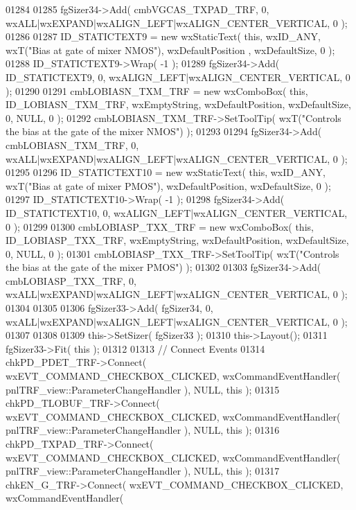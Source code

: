 \begin{DoxyCode}
01284     
01285     fgSizer34->Add( cmbVGCAS_TXPAD_TRF, 0, wxALL|wxEXPAND|wxALIGN\_LEFT|wxALIGN\_CENTER\_VERTICAL, 0 );
01286     
01287     ID_STATICTEXT9 = \textcolor{keyword}{new} wxStaticText( \textcolor{keyword}{this}, wxID\_ANY, wxT(\textcolor{stringliteral}{"Bias at gate of mixer NMOS"}), wxDefaultPosition
      , wxDefaultSize, 0 );
01288     ID_STATICTEXT9->Wrap( -1 );
01289     fgSizer34->Add( ID_STATICTEXT9, 0, wxALIGN\_LEFT|wxALIGN\_CENTER\_VERTICAL, 0 );
01290     
01291     cmbLOBIASN_TXM_TRF = \textcolor{keyword}{new} wxComboBox( \textcolor{keyword}{this}, ID_LOBIASN_TXM_TRF, wxEmptyString, wxDefaultPosition, 
      wxDefaultSize, 0, NULL, 0 ); 
01292     cmbLOBIASN_TXM_TRF->SetToolTip( wxT(\textcolor{stringliteral}{"Controls the bias at the gate of the mixer NMOS"}) );
01293     
01294     fgSizer34->Add( cmbLOBIASN_TXM_TRF, 0, wxALL|wxEXPAND|wxALIGN\_LEFT|wxALIGN\_CENTER\_VERTICAL, 0 );
01295     
01296     ID_STATICTEXT10 = \textcolor{keyword}{new} wxStaticText( \textcolor{keyword}{this}, wxID\_ANY, wxT(\textcolor{stringliteral}{"Bias at gate of mixer PMOS"}), 
      wxDefaultPosition, wxDefaultSize, 0 );
01297     ID_STATICTEXT10->Wrap( -1 );
01298     fgSizer34->Add( ID_STATICTEXT10, 0, wxALIGN\_LEFT|wxALIGN\_CENTER\_VERTICAL, 0 );
01299     
01300     cmbLOBIASP_TXX_TRF = \textcolor{keyword}{new} wxComboBox( \textcolor{keyword}{this}, ID_LOBIASP_TXX_TRF, wxEmptyString, wxDefaultPosition, 
      wxDefaultSize, 0, NULL, 0 ); 
01301     cmbLOBIASP_TXX_TRF->SetToolTip( wxT(\textcolor{stringliteral}{"Controls the bias at the gate of the mixer PMOS"}) );
01302     
01303     fgSizer34->Add( cmbLOBIASP_TXX_TRF, 0, wxALL|wxEXPAND|wxALIGN\_LEFT|wxALIGN\_CENTER\_VERTICAL, 0 );
01304     
01305     
01306     fgSizer33->Add( fgSizer34, 0, wxALL|wxEXPAND|wxALIGN\_LEFT|wxALIGN\_CENTER\_VERTICAL, 0 );
01307     
01308     
01309     this->SetSizer( fgSizer33 );
01310     this->Layout();
01311     fgSizer33->Fit( \textcolor{keyword}{this} );
01312     
01313     \textcolor{comment}{// Connect Events}
01314     chkPD_PDET_TRF->Connect( wxEVT\_COMMAND\_CHECKBOX\_CLICKED, wxCommandEventHandler( 
      pnlTRF_view::ParameterChangeHandler ), NULL, \textcolor{keyword}{this} );
01315     chkPD_TLOBUF_TRF->Connect( wxEVT\_COMMAND\_CHECKBOX\_CLICKED, wxCommandEventHandler( 
      pnlTRF_view::ParameterChangeHandler ), NULL, \textcolor{keyword}{this} );
01316     chkPD_TXPAD_TRF->Connect( wxEVT\_COMMAND\_CHECKBOX\_CLICKED, wxCommandEventHandler( 
      pnlTRF_view::ParameterChangeHandler ), NULL, \textcolor{keyword}{this} );
01317     chkEN_G_TRF->Connect( wxEVT\_COMMAND\_CHECKBOX\_CLICKED, wxCommandEventHandler( 

\end{DoxyCode}
